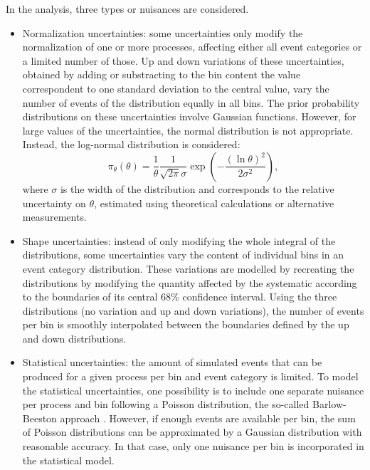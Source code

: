 \documentclass[../main.tex]{subfiles}
\begin{document}
In the \hhbbtt{} analysis, three types or nuisances are considered. 
\begin{itemize}
\item Normalization uncertainties: some uncertainties only modify the normalization of one or more processes, affecting either all event categories or a limited number of those. Up and down variations of these uncertainties, obtained by adding or substracting to the bin content the value correspondent to one standard deviation to the central value, vary the number of events of the distribution equally in all bins. The prior probability distributions on these uncertainties involve Gaussian functions. However, for large values of the uncertainties, the normal distribution is not appropriate. Instead, the log-normal distribution is considered:
\begin{equation}
\pi_\theta(\theta) = \frac{1}{\theta}\frac{1}{\sqrt{2\pi}\sigma}\exp\left(-\frac{(\ln\theta)^2}{2\sigma^2}\right),
\end{equation}
where $\sigma$ is the width of the distribution and corresponds to the relative uncertainty on $\theta$, estimated using theoretical calculations or alternative measurements.

\item Shape uncertainties: instead of only modifying the whole integral of the distributions, some uncertainties vary the content of individual bins in an event category distribution. These variations are modelled by recreating the distributions by modifying the quantity affected by the systematic according to the boundaries of its central 68\% confidence interval. Using the three distributions (no variation and up and down variations), the number of events per bin is smoothly interpolated between the boundaries defined by the up and down distributions.

\item Statistical uncertainties: the amount of simulated events that can be produced for a given process per bin and event category is limited. To model the statistical uncertainties, one possibility is to include one separate nuisance per process and bin following a Poisson distribution, the so-called Barlow-Beeston approach \cite{hh:results:barlow_beeston}. However, if enough events are available per bin, the sum of Poisson distributions can be approximated by a Gaussian distribution with reasonable accuracy. In that case, only one nuisance per bin is incorporated in the statistical model.
\end{itemize}
\end{document}
